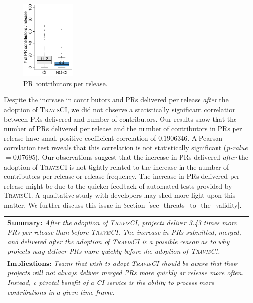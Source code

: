 \begin{figure}[!t]
	\centering
	\includegraphics[width=2.7cm, height=4.0cm]{pr_contributors_prs_per_release.pdf}
	\caption{PR contributors per release.}
	\label{fig:contributors_per_release}
\end{figure}

Despite the increase in contributors and PRs delivered per release \textit{after} the adoption of \textsc{TravisCI},
we did not observe a statistically significant correlation between PRs delivered and number of contributors. Our
results show that the number of PRs delivered per release and the number of contributors in PRs per release have small positive coefficient correlation of $0.1906346$. A Pearson correlation test reveals that this
correlation is not statistically significant (\textit{p-value} $= 0.07695$). 
Our observations suggest that the increase in PRs delivered {\em after}
the adoption of \textsc{TravisCI} is not tightly related to the increase in the number of
contributors per release or release frequency. The increase in PRs delivered per release might be
due to the quicker feedback of automated tests provided by \textsc{TravisCI}. A
qualitative study with developers may shed more light upon this matter. We
further discuss this issue in Section~\ref{sec_threats_to_the_validity}.

\begin{center}
	\begin{tabular}{|p{}|}
		\hline
		\textbf{Summary:}
		\textit{After the adoption of \textsc{TravisCI}, projects deliver 3.43 times more PRs
			per release than \textit{before} \textsc{TravisCI}. The increase in
			PRs submitted, merged, and delivered after the adoption of \textsc{TravisCI} is a possible
			reason as to why projects may deliver PRs more quickly
		\textit{before} the adoption of \textsc{TravisCI}.} \\
		\textbf{Implications:}
		\textit{Teams that wish to adopt \textsc{TravisCI} should be aware that their projects will not always deliver merged PRs more quickly or release more often. Instead, a pivotal benefit of a CI service is the ability to process more contributions in a given time frame.}
		\\
		\hline
	\end{tabular}
\end{center}


